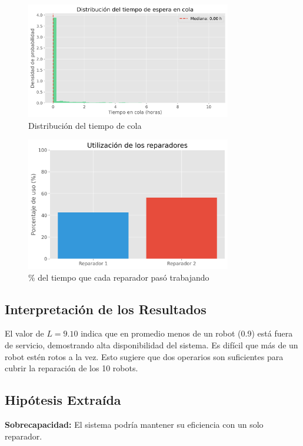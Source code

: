 \documentclass[12pt, a4paper]{article}
\begin{document}
\begin{figure}[h!]
    \centering
    \includegraphics[width=0.8\textwidth]{../img/distribucion_cola.png}
    \caption{Distribución del tiempo de cola}
    \label{fig:ejemplo}
\end{figure}

\begin{figure}[h!]
    \centering
    \includegraphics[width=0.8\textwidth]{../img/utilizacion_reparadores.png}
    \caption{\% del tiempo que cada reparador pasó trabajando}
    \label{fig:ejemplo}
\end{figure}

\subsection{Interpretación de los Resultados}
El valor de $L = 9.10$ indica que en promedio menos de un robot (0.9) está fuera de servicio, demostrando alta disponibilidad del sistema. Es difícil que más de un robot estén rotos a la vez. Esto sugiere que dos operarios son suficientes para cubrir la reparación de los 10 robots.

\subsection{Hipótesis Extraída}
    \textbf{Sobrecapacidad:} El sistema podría mantener su eficiencia con un solo reparador.\\
    
\end{document}
